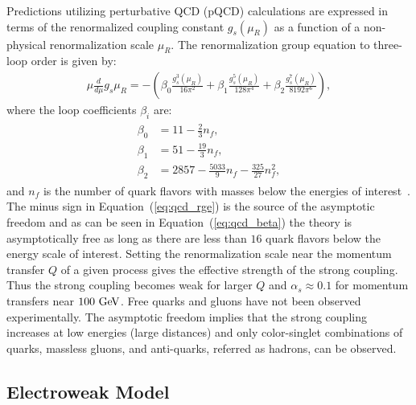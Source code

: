 Predictions utilizing perturbative QCD (pQCD) calculations are expressed in terms of the renormalized coupling constant $g_{s} (\mu_R)$ as a function of a non-physical renormalization scale $\mu_R$. The renormalization group equation to three-loop order is given by:
\begin{eqnarray} \label{eq:qcd_rge}
\mu\frac{d}{d\mu}g_s{\mu_R} = - (\beta_{0} \frac{g_{s}^{3}(\mu_R)}{16\pi^2} +  \beta_{1} \frac{g_{s}^{5}(\mu_R)}{128\pi^4} + \beta_{2} \frac{g_{s}^{7}(\mu_R)}{8192\pi^6}),
\end{eqnarray}
where the loop coefficients $\beta_{i}$ are:
\begin{eqnarray} \label{eq:qcd_beta}
\begin{aligned}
\beta_{0}&=11-\frac{2}{3}n_{f}, \\
\beta_{1}&=51-\frac{19}{3}n_{f}, \\
\beta_{2}&=2857-\frac{5033}{9}n_{f}-\frac{325}{27}n_{f}^2,
\end{aligned}
\end{eqnarray}
and $n_{f}$ is the number of quark flavors with masses below the energies of interest~\cite{Agashe:2014kda}. The minus sign in Equation~(\ref{eq:qcd_rge}) is the source of the asymptotic freedom and as can be seen in Equation~(\ref{eq:qcd_beta}) the theory is asymptotically free as long as there are less than $16$ quark flavors below the energy scale of interest. Setting the renormalization scale near the momentum transfer $Q$ of a given process gives the effective strength of the strong coupling. Thus the strong coupling becomes weak for larger $Q$ and $\alpha_{s} \approx 0.1$ for momentum transfers near $100~\mathrm{Ge\kern -0.1em V}$. Free quarks and gluons have not been observed experimentally. The asymptotic freedom implies that the strong coupling increases at low energies (large distances) and only color-singlet combinations of quarks, massless gluons, and anti-quarks, referred as hadrons, can be observed.  
 
\subsection{Electroweak Model}

